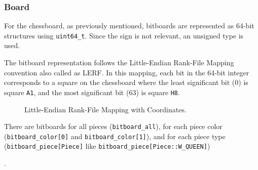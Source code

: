 \subsubsection{Board}

For the chessboard, as previously mentioned, bitboards are represented as 64-bit structures using \texttt{uint64\_t}. Since the sign is not relevant, an unsigned type is used.

\vspace{1em}

\noindent The bitboard representation follows the Little-Endian Rank-File Mapping convention also called as LERF. In this mapping, each bit in the 64-bit integer corresponds to a square on the chessboard where the least significant bit (0) is square \texttt{A1}, and the most significant bit (63) is square \texttt{H8}.

\begin{figure}[H]
    \centering
    \caption{Little-Endian Rank-File Mapping with Coordinates.}
    \label{fig:lerf}
\end{figure}

\noindent \parbox{\textwidth}{There are bitboards for all pieces (\texttt{bitboard\_all}), for each piece color (\texttt{bitboard\_color[0]} and \texttt{bitboard\_color[1]}), and for each piece type (\texttt{bitboard\_piece[Piece]} like \texttt{bitboard\_piece[Piece::W\_QUEEN]})}.

